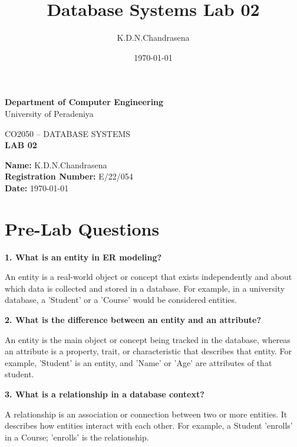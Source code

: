 \documentclass[12pt,a4paper]{article}
\title{Database Systems Lab 02}
\author{K.D.N.Chandrasena}
\date{\today}
\begin{document}
\begin{center}
{\Large \textbf{Department of Computer Engineering}}\\
\vspace{0.2cm}
{\large University of Peradeniya}\\
\vspace{0.6cm}

{\large CO2050 -- DATABASE SYSTEMS}\\
\vspace{0.3cm}
{\Large \textbf{LAB 02}}\\
\vspace{0.2cm}


\end{center}
{\large
\textbf{Name:} K.D.N.Chandrasena\\[0.3cm]
\textbf{Registration Number:} E/22/054\\[0.3cm]
\textbf{Date:} \today
}



\section*{Pre-Lab Questions}

\textbf{1. What is an entity in ER modeling?}

An entity is a real-world object or concept that exists independently and about which data is collected and stored in a database. For example, in a university database, a 'Student' or a 'Course' would be considered entities.

\vspace{0.5cm}

\textbf{2. What is the difference between an entity and an attribute?}

An entity is the main object or concept being tracked in the database, whereas an attribute is a property, trait, or characteristic that describes that entity. For example, 'Student' is an entity, and 'Name' or 'Age' are attributes of that student.

\vspace{0.5cm}

\textbf{3. What is a relationship in a database context?}

A relationship is an association or connection between two or more entities. It describes how entities interact with each other. For example, a Student 'enrolls' in a Course; 'enrolls' is the relationship.
\end{document}
